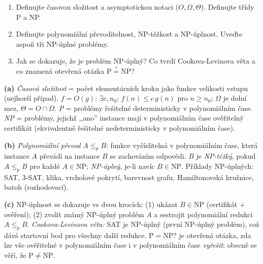 \begin{zadani}
\begin{enumerate}[label=(\alph*)]
  \item {} Definujte časovou složitost a asymptotickou notaci ($O,\Omega,\Theta$). Definujte třídy P a NP.
  \item {} Definujte polynomiální převoditelnost, NP-těžkost a NP-úplnost. Uveďte aspoň tři NP-úplné problémy.
  \item {} Jak se dokazuje, že je problém NP-úplný? Co tvrdí Cookova-Levinova věta a co znamená otevřená otázka $\mathrm{P}\overset{?}{=}\mathrm{NP}$?
\end{enumerate}
\end{zadani}

\begin{reseni}
\textbf{(a)} \emph{Časová složitost} = počet elementárních kroku jako funkce velikosti vstupu (nejhorší případ). $f=O(g)$: $\exists c,n_0:\,f(n)\le c\,g(n)$ pro $n\ge n_0$; $\Omega$ je dolní mez, $\Theta=O\cap\Omega$. \emph{P} = problémy řešitelné deterministicky v polynomiálním čase. \emph{NP} = problémy, jejichž ,,ano'' instance mají v polynomiálním čase ověřitelný certifikát (ekvivalentně řešitelné nedeterministicky v polynomiálním čase).

\textbf{(b)} \emph{Polynomiální převod} $A\le_p B$: funkce vyčíslitelná v polynomiálním čase, která instance $A$ převádí na instance $B$ se zachováním odpovědi. $B$ je \emph{NP-těžký}, pokud $A\le_p B$ pro každé $A\in\mathrm{NP}$; \emph{NP-úplný}, je-li navíc $B\in\mathrm{NP}$. Příklady NP-úplných: SAT, 3-SAT, klika, vrcholové pokrytí, barevnost grafu, Hamiltonovská kružnice, batoh (rozhodovací).

\textbf{(c)} NP-úplnost se dokazuje ve dvou krocích: (1) ukázat $B\in\mathrm{NP}$ (certifikát + ověření); (2) zvolit známý NP-úplný problém $A$ a sestrojit polynomiální redukci $A\le_p B$. \emph{Cookova-Levinova věta:} SAT je NP-úplný (první NP-úplný problém), což dává startovní bod pro všechny další redukce. $\mathrm{P}=\mathrm{NP}$? je otevřená otázka, zda lze vše ověřitelné v polynomiálním čase i v polynomiálním čase \emph{vyřešit}; obecně se věří, že $\mathrm{P}\neq\mathrm{NP}$.
\end{reseni}

